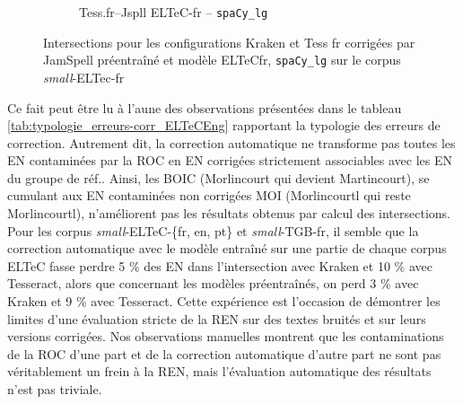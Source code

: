 \begin{figure}[h!]
\begin{minipage}{6.5cm}
\begin{subfigure}{0.8\textwidth}
  \caption{Tess.fr--Jspll ELTeC-fr -- \texttt{spaCy\_lg}}
  \label{fig:ELTeCFRA_Tess -- jspl-ELTeCFR_spacy-lg-concat_intersection}
  \end{subfigure}
    \end{minipage}
\caption{Intersections pour les configurations Kraken et Tess fr corrigées par JamSpell préentraîné et modèle ELTeCfr, \texttt{spaCy\_lg} sur le corpus \textit{small}-ELTec-fr}
\label{fig:intersection_globale-kraken}
\end{figure}

Ce fait peut être lu à l'aune des observations présentées dans le tableau \ref{tab:typologie_erreurs-corr_ELTeCEng} rapportant la typologie des erreurs de correction. Autrement dit, la correction automatique ne transforme pas toutes les EN contaminées par la ROC en EN corrigées strictement associables avec les EN du groupe de réf.. Ainsi, les BOIC (\og{}Morlincourt\fg{} qui devient \og{}Martincourt\fg{}), se cumulant aux EN contaminées non corrigées MOI (\og{}Morlincourtl\fg{} qui reste \og{}Morlincourtl\fg{}), n'améliorent pas les résultats obtenus par calcul des intersections. Pour les corpus \textit{small}-ELTeC-\{fr, en, pt\} et \textit{small}-TGB-fr, il semble que la correction automatique avec le modèle entraîné sur une partie de chaque corpus ELTeC fasse perdre 5 \% des EN dans l'intersection avec Kraken et 10 \% avec Tesseract, alors que concernant les modèles préentraînés, on perd 3 \% avec Kraken et 9 \% avec Tesseract. Cette expérience est l'occasion de démontrer les limites d'une évaluation stricte de la REN sur des textes bruités et sur leurs versions corrigées. Nos observations manuelles montrent que les contaminations de la ROC d'une part et de la correction automatique d'autre part ne sont pas véritablement un frein à la REN, mais l'évaluation automatique des résultats n'est pas triviale.


